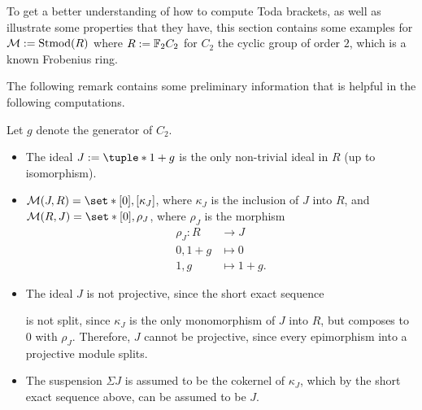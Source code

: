To get a better understanding of how to compute Toda brackets, as well as illustrate some properties that they have, this section contains some examples for \( {\mathcal{M}} := \operatorname{Stmod}(R) \) where \( R := {\mathbb{F}}_2 C_2 \) for \( C_2 \) the cyclic group of order \( 2 \), which is a known Frobenius ring.

The following remark contains some preliminary information that is helpful in the following computations.

\begin{remark}
	\label{rem:toda_bracket_examples_properties}
    Let \( g \) denote the generator of \( C_2 \).
	
	\begin{itemize}
		\item {
			The ideal \( J := \tuple*{1 + g} \) is the only non-trivial ideal in \( R \) (up to isomorphism).
		}
		\item {
			\( \Mc(J, R) = \set*{ [0], [\kappa_J] } \), where \( \kappa_J \) is the inclusion of \( J \) into \( R \), and \( \Mc(R, J) = \set*{ [0], \rho_J } \), where \( \rho_J \) is the morphism
			\begin{align*}
				\rho_J: R &\to J \\
				0, 1 + g &\mapsto 0 \\
				1, g &\mapsto 1 + g.
			\end{align*}
		}
		\item {
			The ideal \( J \) is not projective, since the short exact sequence
			\begin{center}
			\end{center}
			is not split, since \( \kappa_J \) is the only monomorphism of \( J \) into \( R \), but composes to \( 0 \) with \( \rho_J \). Therefore, \( J \) cannot be projective, since every epimorphism into a projective module splits.
		}
		\item {
			The suspension \( \Sigma J \) is assumed to be the cokernel of \( \kappa_J \), which by the short exact sequence above, can be assumed to be \( J \).
		}
	\end{itemize}
\end{remark}

